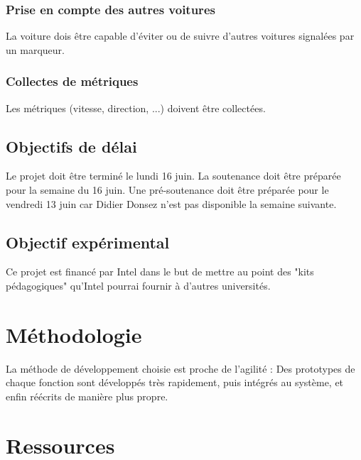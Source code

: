 \documentclass[a4paper,12pt]{article}
\begin{document}
\subsubsection{Prise en compte des autres voitures}

La voiture dois être capable d'éviter ou de suivre d'autres voitures signalées
par un marqueur.

\subsubsection{Collectes de métriques}

Les métriques (vitesse, direction, ...) doivent être collectées.

\subsection{Objectifs de délai}

Le projet doit être terminé le lundi 16 juin.
La soutenance doit être préparée pour la semaine du 16 juin.
Une pré-soutenance doit être préparée pour le vendredi 13 juin car Didier
Donsez n'est pas disponible la semaine suivante.

\subsection{Objectif expérimental}

Ce projet est financé par Intel dans le but de mettre au point des "kits
pédagogiques" qu'Intel pourrai fournir à d'autres universités.











\section{Méthodologie}

La méthode de développement choisie est proche de l'agilité :
Des prototypes de chaque fonction sont développés très rapidement, puis
intégrés au système, et enfin réécrits de manière plus propre.








\section{Ressources}
\end{document}

